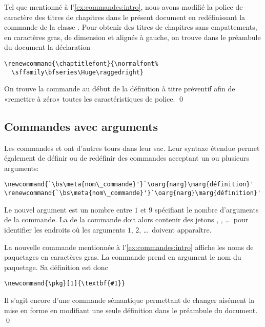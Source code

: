 \begin{exemple}
  Tel que mentionné à l'\autoref{ex:commandes:intro}, nous avons
  modifié la police de caractère des titres de chapitres dans le présent
  document en redéfinissant la commande \cmdprint{\chaptitlefont} de
  la classe . Pour obtenir des titres de chapitres sans
  empattements, en caractères gras, de dimension \cmdprint{\Huge} et
  alignés à gauche, on trouve dans le préambule du document la
  déclaration
\begin{lstlisting}
\renewcommand{\chaptitlefont}{\normalfont%
  \sffamily\bfseries\Huge\raggedright}
\end{lstlisting}
  On trouve la commande \cmd{\normalfont} au début de la définition à
  titre préventif afin de «remettre à zéro» toutes les
  caractéristiques de police. %
  \qed
\end{exemple}


\subsection{Commandes avec arguments}
\label{sec:commandes:commandes:avec_arg}

Les commandes \cmdprint{\newcommand} et \cmdprint{\renewcommand} ont
d'autres tours dans leur sac. Leur syntaxe étendue permet également de
définir ou de redéfinir des commandes acceptant un ou plusieurs
arguments:
\begin{lstlisting}
\newcommand{`\bs\meta{nom\_commande}'}`\oarg{narg}\marg{définition}'
\renewcommand{`\bs\meta{nom\_commande}'}`\oarg{narg}\marg{définition}'
\end{lstlisting}
Le nouvel argument  est un nombre entre $1$ et $9$
spécifiant le nombre d'arguments de la commande. La 
de la commande doit alors contenir des jetons , ,
\dots\ pour identifier les endroits où les arguments $1$, $2$, \dots\
doivent apparaître.

\begin{exemple}
  La nouvelle commande \cmdprint{\pkg} mentionnée à
  l'\autoref{ex:commandes:intro} affiche les noms de paquetages en
  caractères gras. La commande prend en argument le nom du paquetage.
  Sa définition est donc
\begin{lstlisting}
\newcommand{\pkg}[1]{\textbf{#1}}
\end{lstlisting}
  Il s'agit encore d'une commande sémantique permettant de changer
  aisément la mise en forme en modifiant une seule définition dans le
  préambule du document. %
  \qed
\end{exemple}

